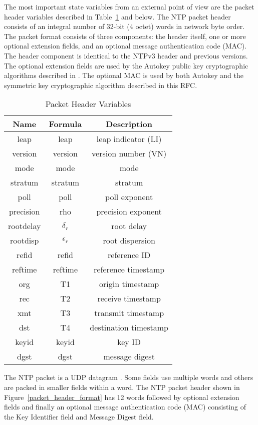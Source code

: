 The most important state variables from an external point of view are
the packet header variables described in Table~\ref{packet_header_variables} and below. The NTP
packet header consists of an integral number of 32-bit (4 octet)
words in network byte order. The packet format consists of three
components: the header itself, one or more optional extension fields,
and an optional message authentication code (MAC). The header
component is identical to the NTPv3 header and previous versions.
The optional extension fields are used by the Autokey public key
cryptographic algorithms described in \cite{RFC5906}. The optional MAC is
used by both Autokey and the symmetric key cryptographic algorithm
described in this RFC.

\begin{table}[htb]
\center
\begin{tabular}{c | c | c}
Name & Formula & Description \\
\hline
\hline
leap & leap & leap indicator (LI) \\
version & version & version number (VN) \\
mode & mode & mode \\
stratum & stratum & stratum \\
poll & poll & poll exponent \\
precision & rho & precision exponent \\
rootdelay & $ \delta_r $ & root delay \\
rootdisp & $ \epsilon_r $ & root dispersion \\
refid & refid & reference ID \\
reftime & reftime & reference timestamp \\
org & T1 & origin timestamp \\
rec & T2 & receive timestamp \\
xmt & T3 & transmit timestamp \\
dst & T4 & destination timestamp \\
keyid & keyid & key ID \\
dgst & dgst & message digest \\
\hline
\end{tabular}
\label{packet_header_variables}
\caption{Packet Header Variables}
\end{table}

The NTP packet is a UDP datagram \cite{RFC0768}. Some fields use multiple
words and others are packed in smaller fields within a word. The NTP
packet header shown in Figure~\ref{packet_header_format} has 12 words followed by optional
extension fields and finally an optional message authentication code
(MAC) consisting of the Key Identifier field and Message Digest
field.

